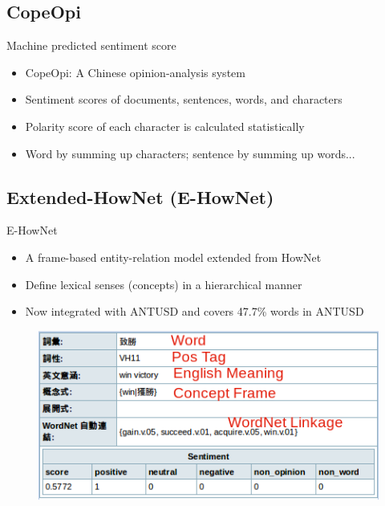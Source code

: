 \documentclass[compress]{beamer}
\begin{document}
    \subsection{CopeOpi}
        \begin{frame}{\subsecname}
            \begin{block}{Machine predicted sentiment score}
                \begin{itemize}
                    \item CopeOpi: A Chinese opinion-analysis system
                    \item Sentiment scores of documents, sentences, words, and characters 
                    \item Polarity score of each character is calculated statistically
                    \item Word by summing up characters; sentence by summing up words...
                \end{itemize}
            \end{block}
        \end{frame}

    \subsection{Extended-HowNet (E-HowNet)}
        \begin{frame}{\subsecname}
            \begin{block}{E-HowNet}
                \begin{itemize}
                    \item A frame-based entity-relation model extended from HowNet
                    \item Define lexical senses (concepts) in a hierarchical manner
                    \item Now integrated with ANTUSD and covers 47.7\% words in ANTUSD
                \end{itemize}
            \end{block}
            \pause
            \begin{figure}
                \includegraphics[height=.5\textheight]{e-hownet.png}
            \end{figure}
        \end{frame}
\end{document}
